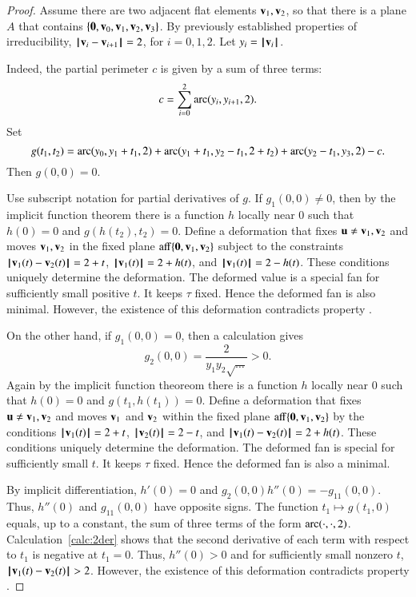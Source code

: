 \begin{proof}
Assume there are two adjacent flat elements ${\mathbf v}_1,{\mathbf v}_2$, so that there is a plane $A$ that contains $\{{\mathbf 0},{\mathbf v}_0,{\mathbf v}_1,{\mathbf v}_2,{\mathbf v}_3\}$.
By previously established properties of irreducibility,
%
${\hskip0.1em|\hskip-0.15em|\hskip0.1em}{\mathbf v}_i - {\mathbf v}_{i+1}{\hskip0.1em|\hskip-0.15em|\hskip0.1em}=2$, for $i=0,1,2$.
Let $y_i = {{\hskip0.1em|\hskip-0.15em|\hskip0.1em}{\mathbf v}_i{\hskip0.1em|\hskip-0.15em|\hskip0.1em}}$.
%

  Indeed,
the partial perimeter $c$ is given by a sum of three terms:
  $$
  c=\sum_{i=0}^2\operatorname{arc}(y_i,y_{i+1},2).
  $$
Set
$$
g(t_1,t_2) = \operatorname{arc}(y_0,y_1+t_1,2) + \operatorname{arc}(y_1+t_1,y_2-t_1,2+t_2) + \operatorname{arc}(y_2-t_1,y_3,2) - c.
$$
Then $g(0,0)=0$.  

Use subscript notation for partial derivatives of $g$.  If $g_1(0,0) \ne 0$, then by the implicit function theorem there is a function $h$ locally near $0$ such that $h(0)=0$ and $g(h(t_2),t_2)=0$.  Define a deformation that fixes ${\mathbf u}\ne{\mathbf v}_1,{\mathbf v}_2$ and moves ${\mathbf v}_1,{\mathbf v}_2$ in the fixed plane ${\operatorname{aff}}\{{\mathbf 0},{\mathbf v}_1,{\mathbf v}_2\}$ subject to the constraints ${\hskip0.1em|\hskip-0.15em|\hskip0.1em}{\mathbf v}_1(t) - {\mathbf v}_2(t){\hskip0.1em|\hskip-0.15em|\hskip0.1em}=2+t$, ${{\hskip0.1em|\hskip-0.15em|\hskip0.1em}{\mathbf v}_1(t){\hskip0.1em|\hskip-0.15em|\hskip0.1em}} = 2+h(t)$, and ${{\hskip0.1em|\hskip-0.15em|\hskip0.1em}{\mathbf v}_1(t){\hskip0.1em|\hskip-0.15em|\hskip0.1em}} = 2-h(t)$.  These conditions uniquely determine the deformation.  The deformed value is a special fan for sufficiently small positive $t$.  It keeps $\tau$ fixed.  Hence the deformed fan is also  minimal.  However, the existence of this deformation contradicts property .

On the other hand, if $ g_1(0,0) =0$, then a calculation gives
$$g_2(0,0) = \dfrac{2}{y_1y_2\sqrt{\ldots}} > 0.$$
Again by the implicit function theoreom there is a function $h$ locally near $0$ such that $h(0)=0$ and $g(t_1,h(t_1))=0$.   Define a deformation that fixes ${\mathbf u}\ne {\mathbf v}_1,{\mathbf v}_2$ and moves ${\mathbf v}_1$ and ${\mathbf v}_2$ within the fixed plane ${\operatorname{aff}}\{{\mathbf 0},{\mathbf v}_1,{\mathbf v}_2\}$ by the conditions ${{\hskip0.1em|\hskip-0.15em|\hskip0.1em}{\mathbf v}_1(t){\hskip0.1em|\hskip-0.15em|\hskip0.1em}} = 2 + t$, ${{\hskip0.1em|\hskip-0.15em|\hskip0.1em}{\mathbf v}_2(t){\hskip0.1em|\hskip-0.15em|\hskip0.1em}} = 2 - t$, and ${\hskip0.1em|\hskip-0.15em|\hskip0.1em}{\mathbf v}_1(t) - {\mathbf v}_2(t){\hskip0.1em|\hskip-0.15em|\hskip0.1em}=2+h(t)$.  These conditions uniquely determine the deformation.  The deformed fan is special for sufficiently small $t$.  It keeps $\tau$ fixed.  Hence the deformed fan is also a minimal.

By implicit differentiation,  $h'(0) = 0$ and 
$g_2(0,0) h''(0) = -g_{11}(0,0)$.  Thus, $h''(0)$ and $g_{11}(0,0)$ have opposite signs.
The function $t_1\mapsto g(t_1,0)$ equals, up to a constant, the sum of three terms of the form
$\operatorname{arc}(\cdot,\cdot,2)$.
Calculation~\ref{calc:2der} shows that the second derivative of each term with respect to $t_1$ is negative at $t_1=0$.
Thus, $h''(0)>0$ and for sufficiently small nonzero $t$, 
${\hskip0.1em|\hskip-0.15em|\hskip0.1em}{\mathbf v}_1(t) - {\mathbf v}_2(t){\hskip0.1em|\hskip-0.15em|\hskip0.1em}>2$.
  However, the existence of this deformation contradicts property .
\end{proof}







